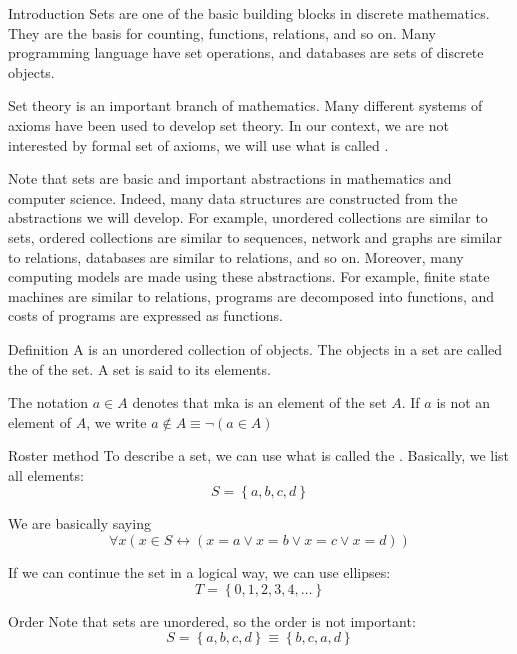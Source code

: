 \documentclass{article}
\begin{document}
\begin{parag}{Introduction}
    Sets are one of the basic building blocks in discrete mathematics. They are the basis for counting, functions, relations, and so on. Many programming language have set operations, and databases are sets of discrete objects.

    Set theory is an important branch of mathematics. Many different systems of axioms have been used to develop set theory. In our context, we are not interested by formal set of axioms, we will use what is called .
    
    Note that sets are basic and important abstractions in mathematics and computer science. Indeed, many data structures are constructed from the abstractions we will develop. For example, unordered collections are similar to sets, ordered collections are similar to sequences, network and graphs are similar to relations, databases are similar to relations, and so on. Moreover, many computing models are made using these abstractions. For example, finite state machines are similar to relations, programs are decomposed into functions, and costs of programs are expressed as functions.
\end{parag}

\begin{parag}{Definition}
    A  is an unordered collection of objects. The objects in a set are called the  of the set. A set is said to  its elements. 

    The notation $a \in A$ denotes that mka  is an element of the set $A$. If $a$ is not an element of $A$, we write $a \not\in A \equiv \lnot\left(a \in A\right)$
\end{parag}

\begin{parag}{Roster method}
    To describe a set, we can use what is called the . Basically, we list all elements: 
    \[S = \left\{a, b, c, d\right\}\]
    
    We are basically saying 
    \[\forall x \left(x \in S \leftrightarrow \left(x = a \lor x = b \lor x = c \lor x = d\right)\right)\]

    If we can continue the set in a logical way, we can use ellipses: 
    \[T = \left\{0, 1, 2, 3, 4, \ldots\right\}\]

    \begin{subparag}{Order}
        Note that sets are unordered, so the order is not important: 
        \[S = \left\{a, b, c, d\right\} \equiv \left\{b, c, a, d\right\}\]
    \end{subparag}
\end{parag}
\end{document}
